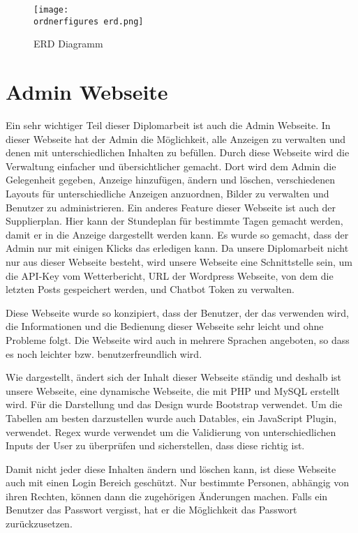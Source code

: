 \begin{figure}[H]
	\centering
	\texttt{[image: \\ordnerfigures erd.png]}
	\caption{ERD Diagramm}
	\label{fi:erd}
\end{figure}

\section{Admin Webseite}
Ein sehr wichtiger Teil dieser Diplomarbeit ist auch die Admin Webseite. In dieser Webseite hat der Admin die M\"{o}glichkeit, alle Anzeigen zu verwalten und denen mit unterschiedlichen Inhalten zu bef\"{u}llen. Durch diese Webseite wird die Verwaltung einfacher und \"{u}bersichtlicher gemacht. Dort wird dem Admin die Gelegenheit gegeben, Anzeige hinzuf\"{u}gen, \"{a}ndern und l\"{o}schen, verschiedenen Layouts f\"{u}r unterschiedliche Anzeigen anzuordnen, Bilder zu verwalten und Benutzer zu administrieren. Ein anderes Feature dieser Webseite ist auch der Supplierplan. Hier kann der Stundeplan f\"{u}r bestimmte Tagen gemacht werden, damit er in die Anzeige dargestellt werden kann. Es wurde so gemacht, dass der Admin nur mit einigen Klicks das erledigen kann. Da unsere Diplomarbeit nicht nur aus dieser Webseite besteht, wird unsere Webseite eine Schnittstelle sein, um die API-Key vom Wetterbericht, URL der Wordpress Webseite, von dem die letzten Posts gespeichert werden, und Chatbot Token zu verwalten.

Diese Webseite wurde so konzipiert, dass der Benutzer, der das verwenden wird, die Informationen und die Bedienung dieser Webseite sehr leicht und ohne Probleme folgt. Die Webseite wird auch in mehrere Sprachen angeboten, so dass es noch leichter bzw. benutzerfreundlich wird.

Wie dargestellt, \"{a}ndert sich der Inhalt dieser Webseite  st\"{a}ndig und deshalb ist unsere Webseite, eine dynamische Webseite, die mit PHP und MySQL erstellt wird. F\"{u}r die Darstellung und das Design wurde Bootstrap verwendet. Um die Tabellen am besten darzustellen wurde auch Datables, ein JavaScript Plugin, verwendet. Regex wurde verwendet um die Validierung von unterschiedlichen Inputs der User zu \"{u}berpr\"{u}fen und sicherstellen, dass diese richtig ist.


Damit nicht jeder diese Inhalten \"{a}ndern und l\"{o}schen kann, ist diese Webseite auch mit einen Login Bereich gesch\"{u}tzt. Nur bestimmte Personen, abh\"{a}ngig von ihren Rechten, k\"{o}nnen dann die zugeh\"{o}rigen \"{A}nderungen machen. Falls ein Benutzer das Passwort vergisst, hat er die M\"{o}glichkeit das Passwort zur\"{u}ckzusetzen.


